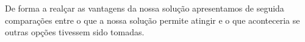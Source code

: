 De forma a realçar as vantagens da nossa solução apresentamos de seguida comparações entre o que a nossa solução permite atingir e o que aconteceria se outras opções tivessem sido tomadas.




